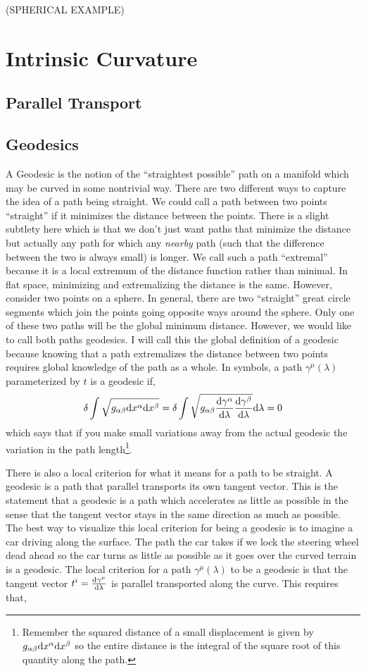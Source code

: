 \documentclass[11pt, a4paper]{article}
\begin{document}
{\color{red} (SPHERICAL EXAMPLE)} 

\section{Intrinsic Curvature}

\subsection{Parallel Transport}


\subsection{Geodesics}

A Geodesic is the notion of the ``straightest possible'' path on a manifold which may be curved in some nontrivial way. There are two different ways to capture the idea of a path being straight. We could call a path between two points ``straight'' if it minimizes the distance between the points. There is a slight subtlety here which is that we don't just want paths that minimize the distance but actually any path for which any \textit{nearby} path (such that the difference between the two is always small) is longer. We call such a path ``extremal'' because it is a local extremum of the distance function rather than minimal. 
In flat space, minimizing and extremalizing the distance is the same. However, consider two points on a sphere. In general, there are two ``straight'' great circle segments which join the points going opposite ways around the sphere. Only one of these two paths will be the global minimum distance. However, we would like to call both paths geodesics. I will call this the global definition of a geodesic because knowing that a path extremalizes the distance between two points requires global knowledge of the path as a whole. In symbols,  a path $\gamma^\mu(\lambda)$ parameterized by $t$ is a geodesic if,
\[ \delta \int \sqrt{g_{\alpha \beta} \mathrm{d}x^\alpha \mathrm{d}x^\beta} = \delta \int \sqrt{g_{\alpha \beta} \frac{\mathrm{d}\gamma^\alpha}{\mathrm{d}\lambda} \frac{\mathrm{d}\gamma^\beta}{\mathrm{d}\lambda}} \mathrm{d}\lambda = 0 \]
which says that if you make small variations away from the actual geodesic the variation in the path length\footnote{Remember the squared distance of a small displacement is given by $g_{\alpha \beta} \mathrm{d}x^\alpha \mathrm{d}x^\beta$ so the entire distance is the integral of the square root of this quantity along the path.}.
\par
There is also a local criterion for what it means for a path to be straight. A geodesic is a path that parallel transports its own tangent vector. This is the statement that a geodesic is a path which accelerates as little as possible in the sense that the tangent vector stays in the same direction as much as possible. The best way to visualize this local criterion for being a geodesic is to imagine a car driving along the surface. The path the car takes if we lock the steering wheel dead ahead so the car turns as little as possible as it goes over the curved terrain is a geodesic. The local criterion for a path $\gamma^\mu(\lambda)$ to be a geodesic is that the tangent vector $t^i = \frac{\mathrm{d}\gamma^\mu}{\mathrm{d}\lambda}$ is parallel transported along the curve. This requires that,
\end{document}
